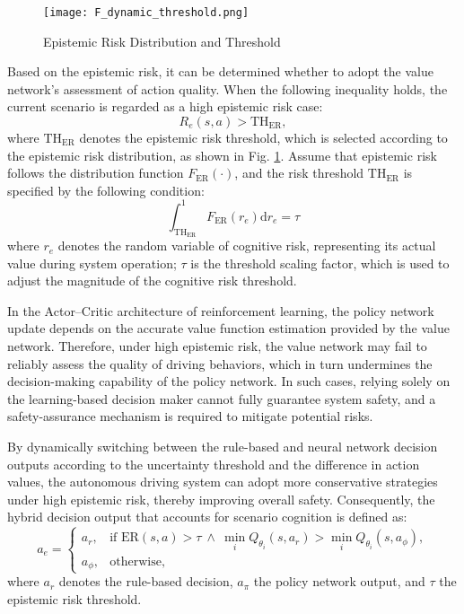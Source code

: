 \documentclass[preprint,12pt,authoryear]{elsarticle}
\begin{document}
\begin{figure}[hbtp]
\centering
\texttt{[image: F\_dynamic\_threshold.png]}
\caption{Epistemic Risk Distribution and Threshold}
\label{F_dynamic_threshold}
\end{figure}

Based on the epistemic risk, it can be determined whether to adopt the value network’s assessment of action quality. When the following inequality holds, the current scenario is regarded as a high epistemic risk case:
\begin{equation}
R_e(s,a) > \text{TH}_\text{ER},
\label{eq4_8}
\end{equation}
where $\text{TH}_\text{ER}$ denotes the epistemic risk threshold, which is selected according to the epistemic risk distribution, as shown in Fig. \ref{F_dynamic_threshold}. 
Assume that epistemic risk follows the distribution function $F_\text{ER}(\cdot)$, 
and the risk threshold $\mathrm{TH}_\mathrm{ER}$ is specified by the following condition:
\begin{equation}
\int_{\mathrm{TH}_\mathrm{ER}}^{1} F_{\mathrm{ER}}\left(r_{e}\right) \mathrm{d} r_{e}=\tau
\label{eq4_9}
\end{equation}
where $r_e$ denotes the random variable of cognitive risk, representing its actual value during system operation; $\tau$ is the threshold scaling factor, which is used to adjust the magnitude of the cognitive risk threshold.

In the Actor–Critic architecture of reinforcement learning, the policy network update depends on the accurate value function estimation provided by the value network. Therefore, under high epistemic risk, the value network may fail to reliably assess the quality of driving behaviors, which in turn undermines the decision-making capability of the policy network. In such cases, relying solely on the learning-based decision maker cannot fully guarantee system safety, and a safety-assurance mechanism is required to mitigate potential risks.

By dynamically switching between the rule-based and neural network decision outputs according to the uncertainty threshold and the difference in action values, the autonomous driving system can adopt more conservative strategies under high epistemic risk, thereby improving overall safety. Consequently, the hybrid decision output that accounts for scenario cognition is defined as:
\begin{equation}
a_e = 
\begin{cases}
a_{r}, & \text{if } \text{ER}(s,a) > \tau \ \wedge \ \min_{i} Q_{\theta_i}(s,a_{r}) > \min_{i} Q_{\theta_i}(s,a_{\phi}), \\[6pt]
a_{\phi}, & \text{otherwise},
\end{cases}
\label{eq4_10}
\end{equation}
where $a_{r}$ denotes the rule-based decision, $a_{\pi}$ the policy network output, and $\tau$ the epistemic risk threshold.
\end{document}
